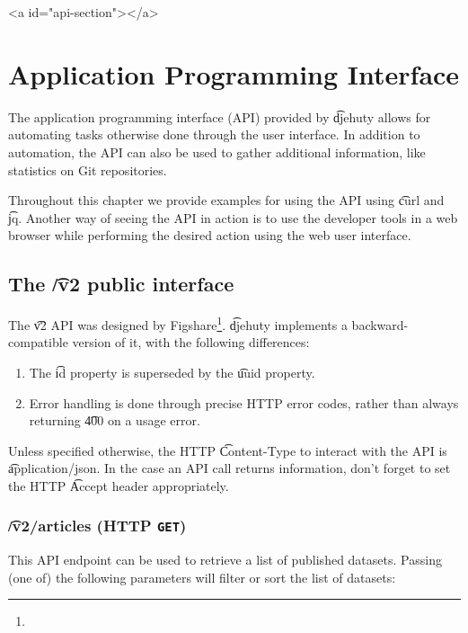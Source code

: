 \ifdefined\HCode
\begin{html}
<a id="api-section"></a>
\end{html}
\fi
\chapter{Application Programming Interface}

  The application programming interface (API) provided by \t{djehuty} allows
  for automating tasks otherwise done through the user interface.  In addition
  to automation, the API can also be used to gather additional information,
  like statistics on Git repositories.

  Throughout this chapter we provide examples for using the API using \t{curl} and \t{jq}.
  Another way of seeing the API in action is to use the developer tools in a web
  browser while performing the desired action using the web user interface.

\section{The \t{/v2} public interface}

  The \t{v2} API was designed by Figshare\footnote{}.
  \t{djehuty} implements a backward-compatible version of it, with the
  following differences:
  \begin{enumerate}
    \item{The \t{id} property is superseded by the \t{uuid} property.}
    \item{Error handling is done through precise HTTP error codes,
        rather than always returning \t{400} on a usage error.}
  \end{enumerate}

  Unless specified otherwise, the HTTP \t{Content-Type} to interact
  with the API is \t{application/json}.  In the case an API call returns
  information, don't forget to set the HTTP \t{Accept} header appropriately.

\subsection{\t{/v2/articles} (HTTP \texttt{GET})}
\label{sec:v2-articles}

  This API endpoint can be used to retrieve a list of published datasets.
  Passing (one of) the following parameters will filter or sort the list of
  datasets:

